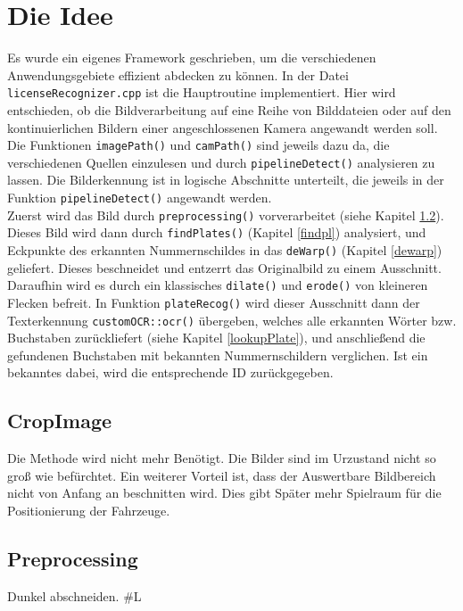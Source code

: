 \documentclass{../Vorlage/sebDenCls}
\begin{document}

\section{Die Idee}
Es wurde ein eigenes Framework geschrieben, um die verschiedenen Anwendungsgebiete effizient abdecken zu können. In der Datei \texttt{licenseRecognizer.cpp} ist die Hauptroutine implementiert.
Hier wird entschieden, ob die Bildverarbeitung auf eine Reihe von Bilddateien oder auf den kontinuierlichen Bildern einer angeschlossenen Kamera angewandt werden soll.
Die Funktionen \texttt{imagePath()} und \texttt{camPath()} sind jeweils dazu da, die verschiedenen Quellen einzulesen und durch \texttt{pipelineDetect()} analysieren zu lassen. Die Bilderkennung ist in logische Abschnitte unterteilt, die jeweils in der Funktion \texttt{pipelineDetect()} angewandt werden.\\
Zuerst wird das Bild durch \texttt{preprocessing()} vorverarbeitet (siehe Kapitel \ref{prepro}). Dieses Bild wird dann durch \texttt{findPlates()} (Kapitel \ref{findpl}) analysiert, und Eckpunkte des erkannten Nummernschildes in das \texttt{deWarp()} (Kapitel \ref{dewarp}) geliefert. Dieses beschneidet und entzerrt das Originalbild zu einem Ausschnitt. Daraufhin wird es durch ein klassisches \texttt{dilate()} und \texttt{erode()} von kleineren Flecken befreit. In Funktion \texttt{plateRecog()} wird dieser Ausschnitt dann der Texterkennung \texttt{customOCR::ocr()} übergeben, welches alle erkannten Wörter bzw. Buchstaben zurückliefert (siehe Kapitel \ref{lookupPlate}), und anschließend die gefundenen Buchstaben mit bekannten Nummernschildern verglichen. Ist ein bekanntes dabei, wird die entsprechende ID zurückgegeben.

\subsection{CropImage}
Die Methode wird nicht mehr Benötigt. Die Bilder sind im Urzustand nicht so groß wie befürchtet. Ein weiterer Vorteil ist, dass der Auswertbare Bildbereich nicht von Anfang an beschnitten wird. Dies gibt Später mehr Spielraum für die Positionierung der Fahrzeuge.
\subsection{Preprocessing}
\label{prepro}
Dunkel abschneiden.
\#L
\end{document}
